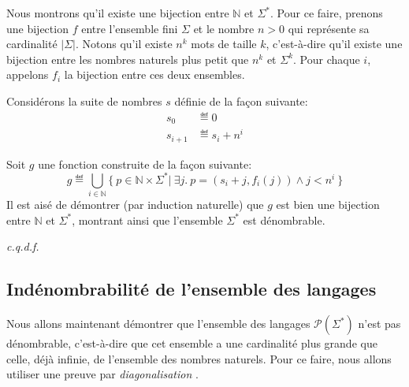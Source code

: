 Nous montrons qu'il existe une bijection entre $\mathbb{N}$ et $\Sigma^*$.
Pour ce faire, prenons une bijection $f$ entre l'ensemble fini $\Sigma$ et le nombre $n > 0$ qui représente sa cardinalité $|\Sigma|$.
Notons qu'il existe $n^k$ mots de taille $k$, c'est-à-dire qu'il existe une bijection entre les nombres naturels plus petit que $n^k$ et $\Sigma^k$. Pour chaque $i$, appelons $f_i$ la bijection entre ces deux ensembles.

Considérons la suite de nombres $s$ définie de la façon suivante:
\begin{align*}
s_0 &\eqdef 0\\
s_{i + 1} &\eqdef s_i + n^i
\end{align*}

Soit $g$ une fonction construite de la façon suivante:
\[
g \eqdef \bigcup_{i \in \mathbb{N}} \{\ p \in \mathbb{N} \times \Sigma^* |\ \exists j.\ p = (s_i + j, f_i(j)) \wedge j < n^i\ \}
\]
Il est aisé de démontrer (par induction naturelle) que $g$ est bien une bijection entre $\mathbb{N}$ et $\Sigma^*$, montrant ainsi que l'ensemble $\Sigma^*$ est dénombrable.

\textit{c.q.d.f.}

\subsection{Indénombrabilité de l'ensemble des langages}

Nous allons maintenant démontrer que l'ensemble des langages $\mathcal{P}(\Sigma^*)$ n'est pas dénombrable, c'est-à-dire que cet ensemble a une cardinalité plus grande que celle, déjà infinie, de l'ensemble des nombres naturels.
Pour ce faire, nous allons utiliser une preuve par \og \textit{diagonalisation} \fg{}.

